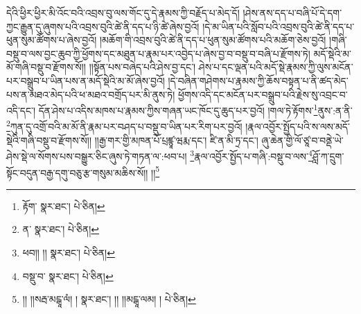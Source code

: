 དེའི་ཕྱིར་ཕྱིར་མི་འོང་བའི་འབྲས་བུ་ལས་གོང་དུ་དེ་རྣམས་ཀྱི་བརྗོད་པ་མེད་དོ། །ཤེས་ནས་དད་པ་བཞི་པོ་དེ་དག་ཀྱང་རྒྱུན་དུ་ཞུགས་པའི་འབྲས་བུའི་ཚེ་ནི་དད་པ་ཉི་ཚེ་ཞེས་བྱའོ། །དེ་མ་ཡིན་པའི་སློབ་པའི་འབྲས་བུའི་ཚེ་ནི་དད་པ་ཕུན་སུམ་ཚོགས་པ་ཞེས་བྱའོ། །མཆོག་གི་འབྲས་བུའི་ཚེ་ནི་དད་པ་ཕུན་སུམ་ཚོགས་པའི་མཆོག་ཅེས་བྱའོ། །གཞི་བསྡུ་བ་ལས་བྱང་ཆུབ་ཀྱི་ཕྱོགས་དང་མཐུན་པ་རྣམ་པར་འབྱེད་པ་ཞེས་བྱ་བ་བསྡུ་བ་བཞི་པ་རྫོགས་ཏེ། མདོ་སྡེའི་མ་མོ་གཞི་བསྡུ་བ་རྫོགས་སོ།། །།སྟོན་པས་བཞེད་པའི་ཤེས་བྱ་དང་། ཤེས་པ་དང་ལྡན་པའི་མདོ་སྡེ་རྣམས་ཀྱི་ལུས་མངོན་པར་བསྒྲུབ་པ་ཡིན་པས་ན་མདོ་སྡེའི་མ་མོ་ཞེས་བྱའོ། །དེ་བཞིན་གཤེགས་པ་རྣམས་ཀྱི་ཆོས་བསྟན་པ་ནི་ཚད་མེད་པས་ན་མཐའ་མེད་པའི་ཕ་མཐའ་བགྲོད་པར་མི་ནུས་ཏེ། ཕྱོགས་འདི་དང་མངོན་པར་བསྒྲུབ་པའི་རྗེས་སུ་འབྲང་བ་འདི་དང་། དོན་ཤེས་པ་འདིས་མཁས་པ་རྣམས་ཀྱིས་གཞན་ཡང་ཁོང་དུ་ཆུད་པར་བྱའོ། །གལ་ཏེ་རྟོགས་\footnote{རྟོག་  སྣར་ཐང་།  པེ་ཅིན། }ནུས་:ན་ནི་\footnote{ན་  སྣར་ཐང་།  པེ་ཅིན། }ཀུན་དུ་འགྲོ་བའི་མ་མོ་ནི་རྣམ་པར་བཤད་པ་བསྡུ་བ་ཡིན་པར་རིག་པར་བྱའོ། །རྣལ་འབྱོར་སྤྱོད་པའི་ས་ལས་མདོ་སྡེའི་གཞི་བསྡུ་བ་རྫོགས་སོ།། །།རྒྱ་གར་གྱི་མཁན་པོ་པྲཛྙཱ་ཝརྨ་དང་། ཛི་ན་མི་ཏྲ་དང་། ཞུ་ཆེན་གྱི་ལོ་ཙཱ་བ་བནྡེ་ཡེ་ཤེས་སྡེ་ལ་སོགས་པས་བསྒྱུར་ཅིང་ཞུས་ཏེ་གཏན་ལ་:ཕབ་པ། \footnote{ཕབ།། །།   སྣར་ཐང་།  པེ་ཅིན། }རྣལ་འབྱོར་སྤྱོད་པ་གཞི་:བསྡུ་བ་ལས་\footnote{བསྡུ་བ་  སྣར་ཐང་།  པེ་ཅིན། }ཤློ་ཀ་དྲུག་སྟོང་བདུན་བརྒྱ་དགུ་བཅུ་རྩ་གསུམ་མཆིས་སོ།། །།\footnote{།། །།སརྦ་མངྒཱ་ལཾ། །  སྣར་ཐང་། །། །།མངྒཱ་ལམ། །  པེ་ཅིན། }